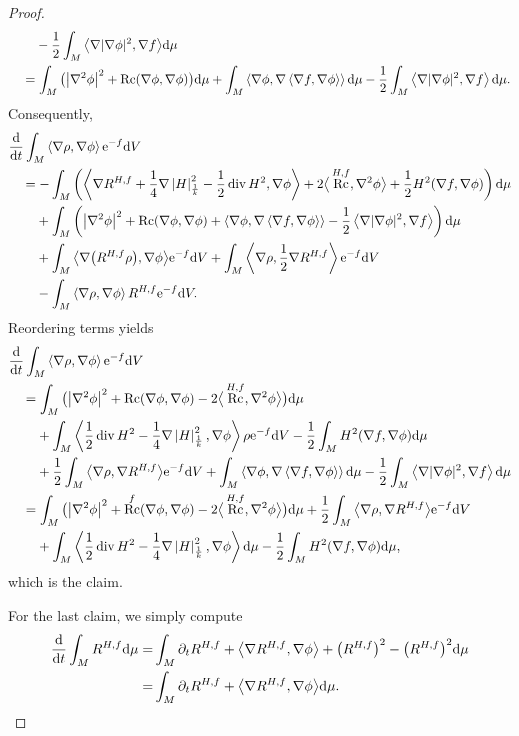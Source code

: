 \documentclass[11pt]{article}
\numberwithin{equation}{section}
\numberwithin{equation}{section}
\newcommand{\del}{\partial}
\newcommand{\N}{\nabla}
\newcommand{\IP}[1]{\left<#1\right>}
\newcommand{\wnorm}[1]{\left|#1\right|^2_{\frac1k}}
\DeclareMathOperator{\Rc}{Rc}
\DeclareMathOperator{\divg}{div}
\begin{document}
\begin{proof}
\begin{align*}
 &\quad \phantom{={}}{} -\frac12\int_M \big\langle\N|\N\phi|^2,\N f\big\rangle {\rm d}\mu\\
	&\quad=\int_M \big(\big|\N^2\phi\big|^2+\Rc(\N\phi,\N\phi)\big) {\rm d}\mu +\int_M \IP{\N \phi,\N\IP{\N f,\N\phi}} {\rm d}\mu-\frac12\int_M \IP{\N|\N\phi|^2,\N f} {\rm d}\mu.
	\end{align*}
Consequently,
	\begin{align*}
	&\frac{{\rm d}}{{\rm d}t}\int_M \IP{\N\rho,\N\phi}{\rm e}^{-f} {\rm d}V\\
	&\quad=-\int_M \left(\IP{\N R^{H,f}+\frac1{4}\N\wnorm{H}-\frac12\divg H^2,\N\phi}+2\big\langle\Rc^{H,f},\N^2\phi\big\rangle+\frac12H^2(\N f,\N\phi) \right) {\rm d}\mu\\
	& \phantom{\quad={}}{} +\int_M \left(\big|\N^2\phi\big|^2+\Rc(\N\phi,\N\phi) + \IP{\N \phi,\N\IP{\N f,\N\phi}} -\frac12 \IP{\N|\N\phi|^2,\N f} \right) {\rm d}\mu\\
	& \phantom{\quad={}}{} +\int_M \big\langle\N\big(R^{H,f}\rho\big),\N \phi\big\rangle{\rm e}^{-f} {\rm d}V +\int_M \IP{\N\rho,\frac12\N R^{H,f}}{\rm e}^{-f} {\rm d}V \\
&\phantom{\quad={}}{}-\int_M \IP{\N\rho,\N\phi} R^{H,f} {\rm e}^{-f} {\rm d}V.
	\end{align*}
 Reordering terms yields
	\begin{align*}
	&\frac{{\rm d}}{{\rm d}t} \int_M \IP{\N\rho,\N\phi}{\rm e}^{-f} {\rm d}V\\
	&\quad=\int_M \big(\big|\N^2\phi\big|^2+\Rc(\N\phi,\N\phi)-2\big\langle\Rc^{H,f},\N^2\phi\big\rangle \big) {\rm d}\mu\\
	&\phantom{\quad={}}{}+\int_M \IP{\frac12\divg H^2-\frac1{4}\N\wnorm{H},\N \phi}\rho {\rm e}^{-f} {\rm d}V -\frac12\int_M H^2(\N f,\N\phi) {\rm d}\mu\\
 &\phantom{\quad={}}{}+\frac12\int_M \big\langle\N\rho,\N R^{H,f}\big\rangle{\rm e}^{-f} {\rm d}V
	+\int_M \IP{\N \phi,\N\IP{\N f,\N\phi}} {\rm d}\mu-\frac12\int_M \IP{\N|\N\phi|^2,\N f} {\rm d}\mu\\
	&\quad=\int_M \big(\big|\N^2\phi\big|^2+\Rc^f(\N\phi,\N\phi)-2\big\langle\Rc^{H,f},\N^2\phi\big\rangle\big) {\rm d}\mu +\frac12\int_M \big\langle\N\rho,\N R^{H,f}\big\rangle{\rm e}^{-f} {\rm d}V\\
 &\phantom{\quad={}}{}+\int_M \IP{\frac12\divg H^2-\frac1{4}\N\wnorm{H},\N \phi} {\rm d}\mu
	-\frac12\int_M H^2(\N f,\N\phi) {\rm d}\mu,
	\end{align*}
	which is the claim.
	
	For the last claim, we simply compute
	\begin{align*}
	\frac{{\rm d}}{{\rm d}t}\int_M R^{H,f} {\rm d}\mu=&\int_M \del_t R^{H,f}+\big\langle\N R^{H,f},\N\phi\big\rangle+\big(R^{H,f}\big)^2-\big(R^{H,f}\big)^2 {\rm d}\mu\\
	=&\int_M \del_t R^{H,f}+\big\langle\N R^{H,f},\N\phi\big\rangle {\rm d}\mu.\tag*{\qed}
	\end{align*} \renewcommand{\qed}{}
\end{proof}
\end{document}

